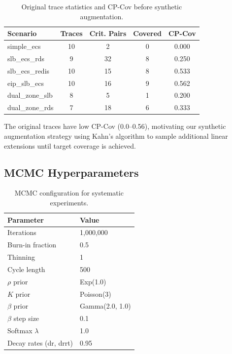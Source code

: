 \begin{table}[h]
\centering
\caption{Original trace statistics and CP-Cov before synthetic augmentation.}
\label{tab:original_cpcov}
\small
\begin{tabular}{lcccc}
\toprule
\textbf{Scenario} & \textbf{Traces} & \textbf{Crit. Pairs} & \textbf{Covered} & \textbf{CP-Cov} \\
\midrule
simple\_ecs & 10 & 2 & 0 & 0.000 \\
slb\_ecs\_rds & 9 & 32 & 8 & 0.250 \\
slb\_ecs\_redis & 10 & 15 & 8 & 0.533 \\
eip\_slb\_ecs & 10 & 16 & 9 & 0.562 \\
dual\_zone\_slb & 8 & 5 & 1 & 0.200 \\
dual\_zone\_rds & 7 & 18 & 6 & 0.333 \\
\bottomrule
\end{tabular}
\end{table}

The original traces have low CP-Cov (0.0--0.56), motivating our synthetic augmentation strategy using Kahn's algorithm to sample additional linear extensions until target coverage is achieved.

\subsection{MCMC Hyperparameters}
\label{app:mcmc_hyperparams}

\begin{table}[h]
\centering
\caption{MCMC configuration for systematic experiments.}
\label{tab:mcmc_config}
\small
\begin{tabular}{ll}
\toprule
\textbf{Parameter} & \textbf{Value} \\
\midrule
Iterations & 1,000,000 \\
Burn-in fraction & 0.5 \\
Thinning & 1 \\
Cycle length & 500 \\
$\rho$ prior & Exp(1.0) \\
$K$ prior & Poisson(3) \\
$\beta$ prior & Gamma(2.0, 1.0) \\
$\beta$ step size & 0.1 \\
Softmax $\lambda$ & 1.0 \\
Decay rates (dr, drrt) & 0.95 \\
\bottomrule
\end{tabular}
\end{table}

